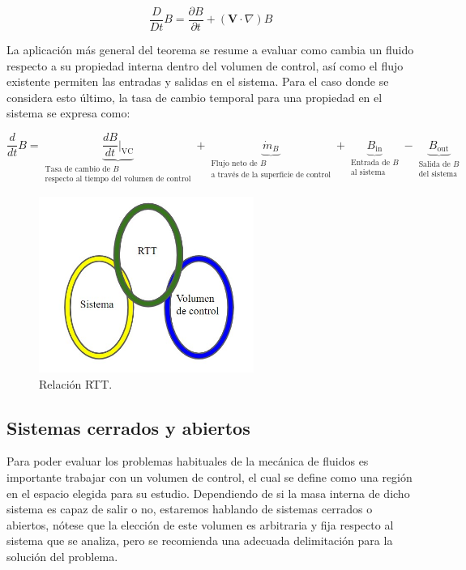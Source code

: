 \documentclass[10pt, oneside]{article}
\begin{document}
\begin{equation}
\frac{D}{Dt}B = \frac{\partial B}{\partial t} + (\mathbf{V} \cdot \nabla)B
\end{equation}

La aplicación más general del teorema se resume a evaluar como cambia un fluido respecto a su propiedad interna dentro del volumen de control, así como el flujo existente permiten las entradas y salidas en el sistema.
Para el caso donde se considera esto último, la tasa de cambio temporal para una propiedad en el sistema se expresa como: 

\begin{equation}
    \frac{d}{dt}B = \underbrace{\frac{dB}{dt}\Bigr|_{\text{VC}}}_{\substack{\text{Tasa de cambio de } B \\\text{respecto al tiempo del volumen de control}}} + \underbrace{\dot{m}_B}_{\substack{\text{Flujo neto de } B \\\text{a través de la superficie de control}}} + \underbrace{B_{\text{in}}}_{\substack{\text{Entrada de } B \\\text{al sistema}}} - \underbrace{B_{\text{out}}}_{\substack{\text{Salida de } B \\\text{del sistema}}}
\end{equation}

\begin{figure}[h]
\centering
\includegraphics[width=7cm]{Fig.9.jpg}
\caption{Relación RTT.}
\label{tmove}
\end{figure}\textbf{}

\subsection{Sistemas cerrados y abiertos}

Para poder evaluar los problemas habituales de la mecánica de fluidos es importante trabajar con un volumen de control, el cual se define como una región en el espacio elegida para su estudio. Dependiendo de si la masa interna de dicho sistema es capaz de salir o no, estaremos hablando de sistemas cerrados o abiertos, nótese que la elección de este volumen es arbitraria y fija respecto al sistema que se analiza, pero se recomienda una adecuada delimitación para la solución del problema.
\end{document}
